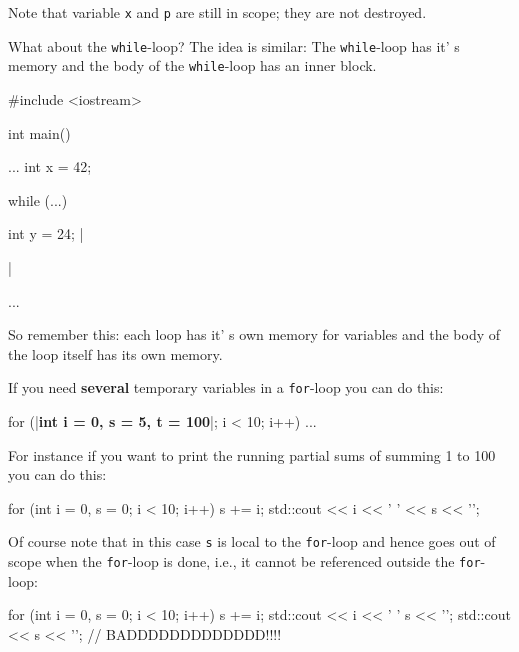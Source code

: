 Note that variable \texttt{x} and \texttt{p} are still in scope; they are not destroyed.

What about the \texttt{while}-loop? The idea is similar: The \texttt{while}-loop has it' s memory and the body of the \texttt{while}-loop has an inner block.

\begin{consolethree}[escapeinside=||]
#include <iostream>

int main()
{    
     ...
     int x = 42;

     while (...)
     {     
           int y = 24;
           ||
     }

     ...
}
\end{consolethree}

So remember this: each loop has it' s own memory for
variables and the body of the loop itself has its own memory.

If you need \textbf{several} temporary variables in a \texttt{for}-loop
you can do this:

\begin{consolethree}[escapeinside=||]
for (|\textbf{int i = 0, s = 5, t = 100}|; i < 10; i++)
{
    ...
}
\end{consolethree}

For instance if you want to print the running partial sums of summing 1
to 100 you can do this:

\begin{console}
for (int i = 0, s = 0; i < 10; i++)
{   
    s += i;
    std::cout << i << ' ' << s << '\n';
}
\end{console}

Of course note that in this case \texttt{s} is local to the \texttt{for}-loop and hence goes out of scope when the \texttt{for}-loop is done, i.e., it cannot be referenced outside the \texttt{for}-loop:

\begin{console}
for (int i = 0, s = 0; i < 10; i++)
{   
    s += i;
    std::cout << i << ' ' s << '\n';
}
std::cout << s << '\n'; // BADDDDDDDDDDDDD!!!!
\end{console}

